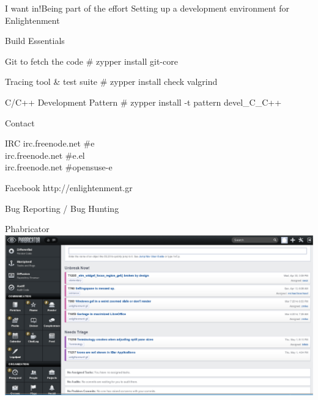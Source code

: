 \documentclass{beamer}
\begin{document}
    \begin{frame}{I want in!}{Being part of the effort}
        \center\huge Setting up a development environment for Enlightenment
    \end{frame}

    \begin{frame}{Build Essentials}
        \begin{block}{Git to fetch the code}
            \# zypper install git-core
        \end{block}
        \begin{block}{Tracing tool \& test suite}
            \# zypper install check valgrind
        \end{block}
        \begin{block}{C/C++ Development Pattern}
            \# zypper install -t pattern devel\_C\_C++
        \end{block}
    \end{frame}

    \begin{frame}{Contact}
        \begin{block}{IRC}
            irc.freenode.net    \#e \\
            irc.freenode.net    \#e.el \\
            irc.freenode.net    \#opensuse-e
        \end{block}
        \begin{block}{Facebook}
            http://enlightenment.gr
        \end{block}
    \end{frame}

    \begin{frame}{Bug Reporting / Bug Hunting}
        \begin{block}{Phabricator}
            \includegraphics[width=\linewidth]{img/phab.eps}
        \end{block}
    \end{frame}
\end{document}
